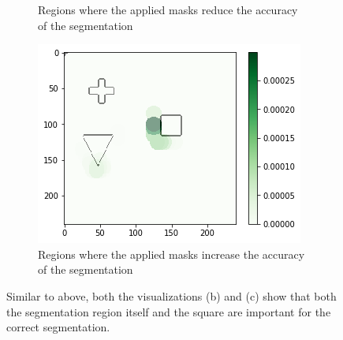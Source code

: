 \begin{figure}[H]
\begin{subfigure}[t]{.34\textwidth}
        \caption{Regions where the applied masks reduce the accuracy of the segmentation}
    \end{subfigure}\hfill%
    \begin{subfigure}[t]{.34\textwidth}
        \centering
        \includegraphics[width=\linewidth]{chapters/06_hdm/testnet/7.png}
        \caption{Regions where the applied masks increase the accuracy of the segmentation}
    \end{subfigure}
    \caption{Similar to above, both the visualizations (b) and (c) show that both the segmentation region itself and the square are important for the correct segmentation.}
    \label{hdm_testnet_2}
\end{figure}

